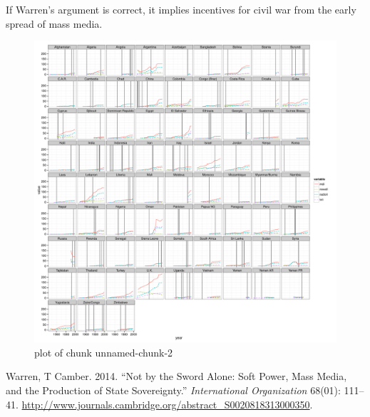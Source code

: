 \documentclass[11pt,article,oneside]{memoir}
\makeatletter
\def\maxwidth{\ifdim\Gin@nat@width>\linewidth\linewidth
\else\Gin@nat@width\fi}
\let\Oldincludegraphics\includegraphics
\renewcommand{\includegraphics}[1]{\Oldincludegraphics[width=\maxwidth]{#1}}
\makeatother
\begin{document}
If Warren's argument is correct, it implies incentives for civil war
from the early spread of mass media.

\begin{figure}[htbp]
\centering
\includegraphics{figure/unnamed-chunk-2.pdf}
\caption{plot of chunk unnamed-chunk-2}
\end{figure}

Warren, T Camber. 2014. ``Not by the Sword Alone: Soft Power, Mass
Media, and the Production of State Sovereignty.'' \emph{International
Organization} 68(01): 111--41.
\url{http://www.journals.cambridge.org/abstract_S0020818313000350}.
\end{document}
